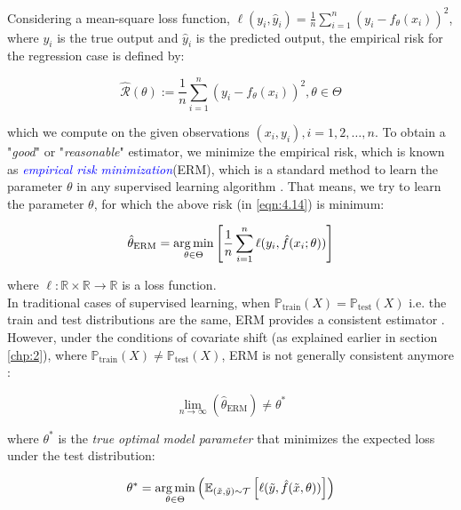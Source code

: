 Considering a mean-square loss function, $\ell(y_i, \hat{y}_i) = \frac{1}{n} \sum_{i=1}^{n} (y_i - f_{\theta}(x_i))^2$, where $y_i$ is the true output and $\hat{y}_i$ is the predicted output, the empirical risk for the regression case is defined by:

\begin{equation}
  \hat{\mathcal{R}}(\theta):= \frac{1}{n}\sum_{i=1}^{n}(y_i - f_{\theta}(x_i))^2, \theta \in \Theta
  \label{eqn:4.14}
\end{equation}

which we compute on the given observations  $(x_i, y_i), i=1, 2, \dots,n$. To obtain a "\textit{good}" or "\textit{reasonable}" estimator, we minimize the empirical risk, which is known as \textcolor{blue}{\emph{empirical risk minimization}}(ERM), which is a standard method to learn the parameter $\theta$ in any supervised learning algorithm \citep{vapnik1998statistical, scholkopf2002learning}. That means, we try to learn the parameter $\theta$, for which the above risk (in \ref{eqn:4.14}) is minimum:

\begin{equation}
    \hat{\theta}_{\text{ERM}} = \operatorname*{arg\,min}_{\theta \in \Theta} \left[ \frac{1}{n}\sum_{i=1}^{n}\ell(y_i, \hat{f}(x_i; \theta)) \right]
    \label{eqn:4.15}
\end{equation}

where $\ell: \mathbb{R} \times \mathbb{R} \to \mathbb{R}$ is a loss function.\\

In traditional cases of supervised learning, when $\mathbb{P}_{\text{train}}(X) = \mathbb{P}_{\text{test}}(X)$ i.e. the train and test distributions are the same, ERM provides a consistent estimator \citep{shimodaira2000improving}. However, under the conditions of covariate shift (as explained earlier in section \ref{chp:2}), where $\mathbb{P}_{\text{train}}(X) \neq \mathbb{P}_{\text{test}}(X)$, ERM is not generally consistent anymore \citep{shimodaira2000improving}:

\begin{equation}
    \lim_{n \to \infty} (\hat{\theta}_{\text{ERM}}) \neq \theta^*
    \label{eqn:4.16}
\end{equation}

where $\theta^*$ is the \emph{true optimal model parameter} that minimizes the expected loss under the test distribution:

\begin{equation}
    \theta^* = \operatorname*{arg\,min}_{\theta \in \Theta} \left( \mathbb{E}_{(\tilde{x}, \tilde{y}) \sim \mathcal{T}} \left[ \ell (\tilde{y}, \hat{f}(\tilde{x}, \theta)) \right] \right)
    \label{eqn:4.17}
\end{equation}


